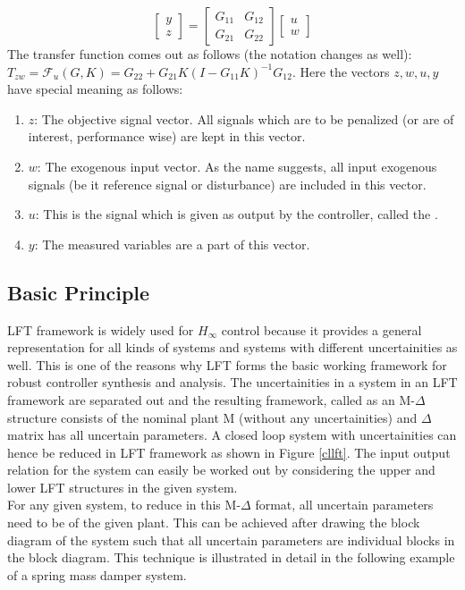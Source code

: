 \documentclass[a4paper,12pt]{article}
\begin{document}
				\[
				\begin{bmatrix} 
				y\\
				z
				\end{bmatrix} = \begin{bmatrix} G_{11} & G_{12} \\ G_{21} & G_{22}\end{bmatrix} \begin{bmatrix} u \\ w\end{bmatrix}
				\]
				The transfer function comes out as follows (the notation changes as well):
				$T_{zw}=\mathscr{F}_{u}(G,K) = G_{22}+G_{21}K(I-G_{11}K)^{-1}G_{12}$. Here the vectors $z,w,u,y$ have special meaning as follows:
				\begin{enumerate}
				\item $z$: The objective signal vector. All signals which are to be penalized (or are of interest, performance wise) are kept in this vector.
				\item $w$: The exogenous input vector. As the name suggests, all input exogenous signals (be it reference signal or disturbance) are included in this vector.
				\item $u$: This is the signal which is given as output by the controller, called the .
				\item $y$: The measured variables are a part of this vector. 
				\end{enumerate}
			
		\subsection{Basic Principle} LFT framework is widely used for $H_{\infty}$ control because it provides a general representation for all kinds of systems and systems with different uncertainities as well. This is one of the reasons why LFT forms the basic working framework for robust controller synthesis and analysis. The uncertainities in a system  in an LFT framework are separated out and the resulting framework, called as an M-$\Delta$ structure consists of the nominal plant M (without any uncertainities) and $\Delta$ matrix has all uncertain parameters. A closed loop system with uncertainities can hence be reduced in LFT framework as shown in Figure \ref{cllft}. 
		The input output relation for the system can easily be worked out by considering the upper and lower LFT structures in the given system. \\For any given system, to reduce in this M-$\Delta$ format, all uncertain parameters need to be  of the given plant. This can be achieved after drawing the block diagram of the system such that all uncertain parameters are individual  blocks in the block diagram. This technique is illustrated in detail in the following example of a spring mass damper system. 
\end{document}
